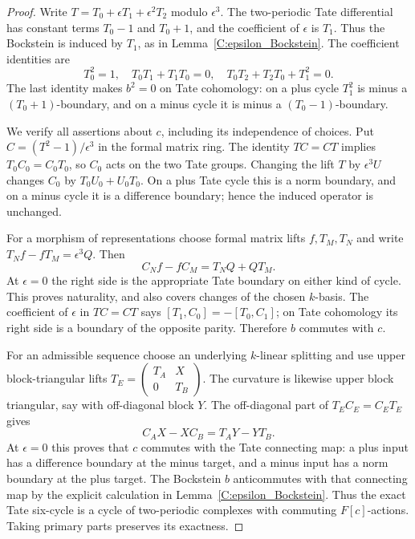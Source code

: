 \begin{proof}
Write $T=T_0+\epsilon T_1+\epsilon^2T_2$ modulo $\epsilon^3$.
The two-periodic Tate differential has constant terms $T_0-1$
and $T_0+1$, and the coefficient of $\epsilon$ is $T_1$.
Thus the Bockstein is induced by $T_1$, as in
Lemma~\ref{C:epsilon_Bockstein}. The coefficient identities are
\[
 T_0^2=1,\quad T_0T_1+T_1T_0=0,\quad
 T_0T_2+T_2T_0+T_1^2=0.
\]
The last identity makes $b^2=0$ on Tate cohomology: on a plus
cycle $T_1^2$ is minus a $(T_0+1)$-boundary, and on a minus
cycle it is minus a $(T_0-1)$-boundary.

We verify all assertions about $c$, including its independence
of choices. Put $C=(T^2-1)/\epsilon^3$ in the formal matrix ring.
The identity $TC=CT$ implies $T_0C_0=C_0T_0$, so $C_0$ acts on
the two Tate groups. Changing the lift $T$ by $\epsilon^3U$
changes $C_0$ by $T_0U_0+U_0T_0$. On a plus Tate cycle this
is a norm boundary, and on a minus cycle it is a difference
boundary; hence the induced operator is unchanged.

For a morphism of representations choose formal matrix lifts
$f,T_M,T_N$ and write
$T_Nf-fT_M=\epsilon^3Q$. Then
\[
 C_N f-f C_M=T_NQ+QT_M.
\]
At $\epsilon=0$ the right side is the appropriate Tate boundary
on either kind of cycle. This proves naturality, and also covers
changes of the chosen $k$-basis. The coefficient of $\epsilon$
in $TC=CT$ says
$[T_1,C_0]=-[T_0,C_1]$; on Tate cohomology its right side is
a boundary of the opposite parity. Therefore $b$ commutes with $c$.

For an admissible sequence choose an underlying $k$-linear
splitting and use upper block-triangular lifts
$T_E=\left(\begin{smallmatrix}T_A&X\\0&T_B\end{smallmatrix}\right)$.
The curvature is likewise upper block triangular, say with
off-diagonal block $Y$. The off-diagonal part of $T_EC_E=C_ET_E$
gives
\[
 C_A X-XC_B=T_A Y-YT_B.
\]
At $\epsilon=0$ this proves that $c$ commutes with the Tate
connecting map: a plus input has a difference boundary at the
minus target, and a minus input has a norm boundary at the plus
target. The Bockstein $b$ anticommutes with that connecting map
by the explicit calculation in Lemma~\ref{C:epsilon_Bockstein}.
Thus the exact Tate six-cycle is a cycle of two-periodic complexes
with commuting $F[c]$-actions. Taking primary parts preserves
its exactness.


\end{proof}
